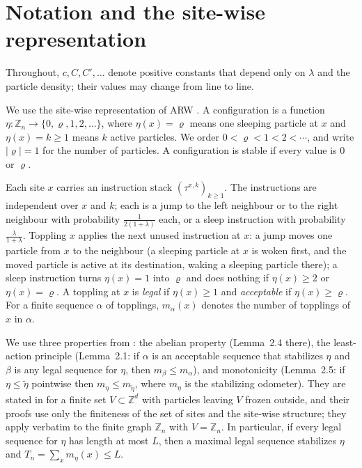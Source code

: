 \documentclass[11pt]{amsart}
\theoremstyle{remark}
\newcommand{\Z}{\mathbb Z}
\newcommand{\sleep}{\varrho}
\begin{document}
\section{Notation and the site-wise representation}\label{sec:prelim}

Throughout, $c,C,C',\ldots$ denote positive constants that depend only on $\lambda$ and the particle density; their
values may change from line to line.

We use the site-wise representation of ARW \cite[Section~2]{Rolla}. A configuration is a function
$\eta:\Z_n\to\{0,\sleep,1,2,\ldots\}$, where $\eta(x)=\sleep$ means one sleeping particle at $x$ and $\eta(x)=k\ge1$
means $k$ active particles. We order $0<\sleep<1<2<\cdots$, and write $|\sleep|=1$ for the number of particles. A
configuration is stable if every value is $0$ or $\sleep$.

Each site $x$ carries an instruction stack $(\tau^{x,k})_{k\ge1}$. The instructions are independent over $x$ and $k$;
each is a jump to the left neighbour or to the right neighbour with probability $\frac{1}{2(1+\lambda)}$ each, or a sleep
instruction with probability $\frac{\lambda}{1+\lambda}$. Toppling $x$ applies the next unused instruction at $x$: a jump
moves one particle from $x$ to the neighbour (a sleeping particle at $x$ is woken first, and the moved particle is active
at its destination, waking a sleeping particle there); a sleep instruction turns $\eta(x)=1$ into $\sleep$ and does
nothing if $\eta(x)\ge2$ or $\eta(x)=\sleep$. A toppling at $x$ is \emph{legal} if $\eta(x)\ge1$ and \emph{acceptable} if
$\eta(x)\ge\sleep$. For a finite sequence $\alpha$ of topplings, $m_\alpha(x)$ denotes the number of topplings of $x$ in
$\alpha$.

We use three properties from \cite[Section~2]{Rolla}: the abelian property (Lemma~2.4 there), the least-action principle
(Lemma~2.1: if $\alpha$ is an acceptable sequence that stabilizes $\eta$ and $\beta$ is any legal sequence for $\eta$,
then $m_\beta\le m_\alpha$), and monotonicity (Lemma~2.5: if $\eta\le\tilde\eta$ pointwise then
$m_\eta\le m_{\tilde\eta}$, where $m_\eta$ is the stabilizing odometer). They are stated in \cite{Rolla} for a finite set
$V\subset\Z^d$ with particles leaving $V$ frozen outside, and their proofs use only the finiteness of the set of sites
and the site-wise structure; they apply verbatim to the finite graph $\Z_n$ with $V=\Z_n$. In particular, if every legal
sequence for $\eta$ has length at most $L$, then a maximal legal sequence stabilizes $\eta$ and $T_n=\sum_x m_\eta(x)\le L$.
\end{document}
